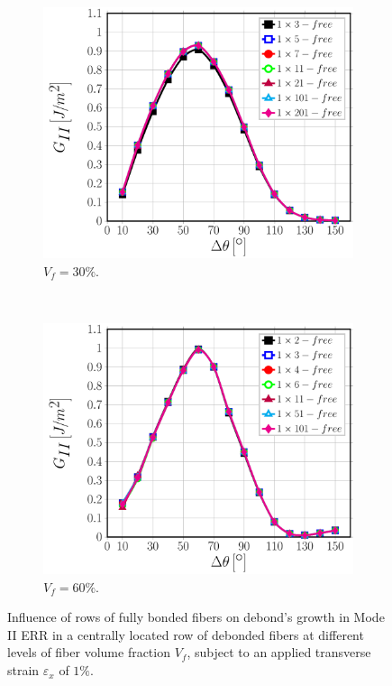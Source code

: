 \documentclass[review]{elsarticle}
\begin{document}
\begin{figure}[!h]
\centering
    \begin{subfigure}[b]{0.45\textwidth}
        \includegraphics[width=\textwidth]{abovefibers-vf30-GII.pdf}
        \caption{$V_{f}=30\%$.}\label{subfig:abovefiber30MII}
    \end{subfigure} ~
    \begin{subfigure}[b]{0.45\textwidth}
        \includegraphics[width=\textwidth]{abovefibers-vf60-GII.pdf}
        \caption{$V_{f}=60\%$.}\label{subfig:abovefiber60MII}
    \end{subfigure}

\caption{Influence of rows of fully bonded fibers on debond's growth in Mode II ERR in a centrally located row of debonded fibers at different levels of fiber volume fraction $V_{f}$, subject to an applied transverse strain $\varepsilon_{x}$ of $1\%$.}\label{fig:abovefibersMII}
\end{figure}
\end{document}
